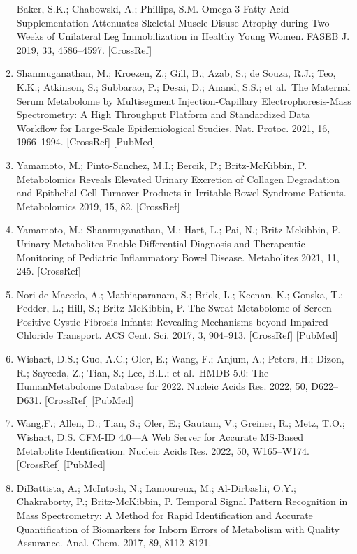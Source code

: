 \documentclass[journal=jacsat,manuscript=article]{achemso}
\begin{document}
\begin{enumerate}
  Baker, S.K.; Chabowski, A.; Phillips, S.M. Omega-3 Fatty Acid
  Supplementation Attenuates Skeletal Muscle Disuse Atrophy during Two
  Weeks of Unilateral Leg Immobilization in Healthy Young Women. FASEB
  J. 2019, 33, 4586--4597. {[}CrossRef{]}
\item
  Shanmuganathan, M.; Kroezen, Z.; Gill, B.; Azab, S.; de Souza, R.J.;
  Teo, K.K.; Atkinson, S.; Subbarao, P.; Desai, D.; Anand, S.S.; et
  al.~The Maternal Serum Metabolome by Multisegment Injection-Capillary
  Electrophoresis-Mass Spectrometry: A High Throughput Platform and
  Standardized Data Workflow for Large-Scale Epidemiological Studies.
  Nat. Protoc. 2021, 16, 1966--1994. {[}CrossRef{]} {[}PubMed{]}
\item
  Yamamoto, M.; Pinto-Sanchez, M.I.; Bercik, P.; Britz-McKibbin, P.
  Metabolomics Reveals Elevated Urinary Excretion of Collagen
  Degradation and Epithelial Cell Turnover Products in Irritable Bowel
  Syndrome Patients. Metabolomics 2019, 15, 82. {[}CrossRef{]}
\item
  Yamamoto, M.; Shanmuganathan, M.; Hart, L.; Pai, N.; Britz-Mckibbin,
  P. Urinary Metabolites Enable Differential Diagnosis and Therapeutic
  Monitoring of Pediatric Inflammatory Bowel Disease. Metabolites 2021,
  11, 245. {[}CrossRef{]}
\item
  Nori de Macedo, A.; Mathiaparanam, S.; Brick, L.; Keenan, K.; Gonska,
  T.; Pedder, L.; Hill, S.; Britz-McKibbin, P. The Sweat Metabolome of
  Screen-Positive Cystic Fibrosis Infants: Revealing Mechanisms beyond
  Impaired Chloride Transport. ACS Cent. Sci. 2017, 3, 904--913.
  {[}CrossRef{]} {[}PubMed{]}
\item
  Wishart, D.S.; Guo, A.C.; Oler, E.; Wang, F.; Anjum, A.; Peters, H.;
  Dizon, R.; Sayeeda, Z.; Tian, S.; Lee, B.L.; et al.~HMDB 5.0: The
  HumanMetabolome Database for 2022. Nucleic Acids Res. 2022, 50,
  D622--D631. {[}CrossRef{]} {[}PubMed{]}
\item
  Wang,F.; Allen, D.; Tian, S.; Oler, E.; Gautam, V.; Greiner, R.; Metz,
  T.O.; Wishart, D.S. CFM-ID 4.0---A Web Server for Accurate MS-Based
  Metabolite Identification. Nucleic Acids Res. 2022, 50, W165--W174.
  {[}CrossRef{]} {[}PubMed{]}
\item
  DiBattista, A.; McIntosh, N.; Lamoureux, M.; Al-Dirbashi, O.Y.;
  Chakraborty, P.; Britz-McKibbin, P. Temporal Signal Pattern
  Recognition in Mass Spectrometry: A Method for Rapid Identification
  and Accurate Quantification of Biomarkers for Inborn Errors of
  Metabolism with Quality Assurance. Anal. Chem. 2017, 89, 8112--8121.

\end{enumerate}
\end{document}
